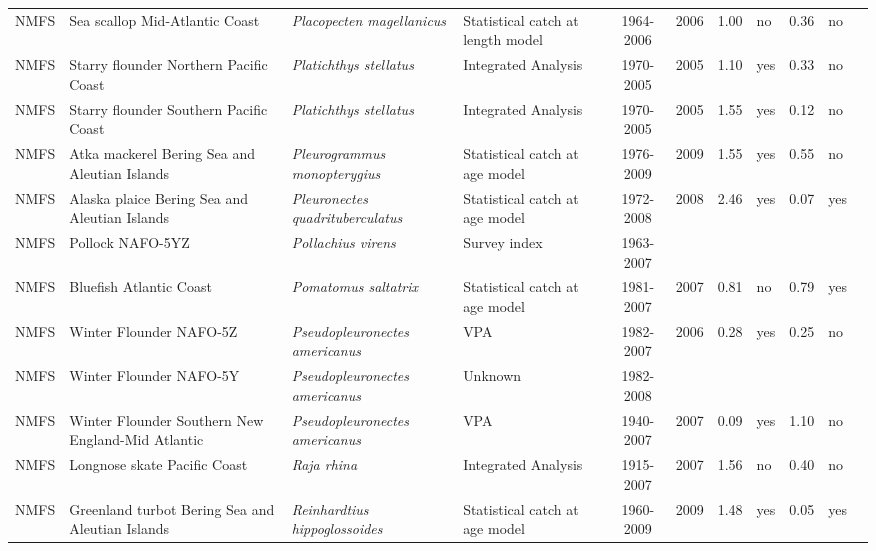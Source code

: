 \begin{longtable}{p{1.8cm}p{3.5cm}p{3.5cm}p{3cm}cccp{0.9cm}cp{0.9cm}c}
  NMFS & Sea scallop Mid-Atlantic Coast & \textit{Placopecten magellanicus} & Statistical catch at length model & 1964-2006 & 2006 & 1.00 & no & 0.36 & no & \cite{SeaScallop2007.pdf} \\ 
  NMFS & Starry flounder Northern Pacific Coast & \textit{Platichthys stellatus} & Integrated Analysis & 1970-2005 & 2005 & 1.10 & yes & 0.33 & no & \cite{2005-SAFE-WCstarryflounder.pdf} \\ 
  NMFS & Starry flounder Southern Pacific Coast & \textit{Platichthys stellatus} & Integrated Analysis & 1970-2005 & 2005 & 1.55 & yes & 0.12 & no & \cite{2005-SAFE-WCstarryflounder.pdf} \\ 
  NMFS & Atka mackerel Bering Sea and Aleutian Islands & \textit{Pleurogrammus monopterygius} & Statistical catch at age model & 1976-2009 & 2009 & 1.55 & yes & 0.55 & no & \cite{2008_SAFE_BSAIatka.pdf} \\ 
  NMFS & Alaska plaice Bering Sea and Aleutian Islands & \textit{Pleuronectes quadrituberculatus} & Statistical catch at age model & 1972-2008 & 2008 & 2.46 & yes & 0.07 & yes & \cite{AFSC-ALPLAICBSAI-2008-Alaska plaice BSAI.pdf} \\ 
  NMFS & Pollock NAFO-5YZ & \textit{Pollachius virens} & Survey index & 1963-2007 &  &  &  &  &  & \cite{http://www.nefsc.noaa.gov/nefsc/publications/crd/crd0815/crd0815.pdf} \\ 
  NMFS & Bluefish Atlantic Coast & \textit{Pomatomus saltatrix} & Statistical catch at age model & 1981-2007 & 2007 & 0.81 & no & 0.79 & yes & \cite{final-2005-SAW-41-assessment.pdf} \\ 
  NMFS & Winter Flounder NAFO-5Z & \textit{Pseudopleuronectes americanus} & VPA & 1982-2007 & 2006 & 0.28 & yes & 0.25 & no & \cite{garm3k.pdf} \\ 
  NMFS & Winter Flounder NAFO-5Y & \textit{Pseudopleuronectes americanus} & Unknown & 1982-2008 &  &  &  &  &  & \cite{http://www.nefsc.noaa.gov/nefsc/publications/crd/crd0815/crd0815.pdf} \\ 
  NMFS & Winter Flounder Southern New England-Mid Atlantic & \textit{Pseudopleuronectes americanus} & VPA & 1940-2007 & 2007 & 0.09 & yes & 1.10 & no & \cite{NMFS-SNEMATL-Pseudopleuronectesamercianus-2008.pdf} \\ 
  NMFS & Longnose skate Pacific Coast & \textit{Raja rhina} & Integrated Analysis & 1915-2007 & 2007 & 1.56 & no & 0.40 & no & \cite{NWFSC-LNOSESKAPCOAST-2008-Longnose skate.pdf} \\ 
  NMFS & Greenland turbot Bering Sea and Aleutian Islands & \textit{Reinhardtius hippoglossoides} & Statistical catch at age model & 1960-2009 & 2009 & 1.48 & yes & 0.05 & yes & \cite{2008_SAFE_BSAIturbot.pdf} \\ 

\end{longtable}
